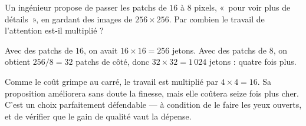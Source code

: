 \begin{exercice}
Un ingénieur propose de passer les patchs de $16$ à $8$ pixels, «~pour voir
plus de détails~», en gardant des images de $256 \times 256$. Par combien le
travail de l'attention est-il multiplié ?
\end{exercice}

\begin{solution}
Avec des patchs de $16$, on avait $16 \times 16 = 256$ jetons. Avec des
patchs de $8$, on obtient $256/8 = 32$ patchs de côté, donc
$32 \times 32 = 1\,024$ jetons : quatre fois plus.

Comme le coût grimpe au carré, le travail est multiplié par
$4 \times 4 = 16$. Sa proposition améliorera sans doute la finesse, mais elle
coûtera seize fois plus cher. C'est un choix parfaitement défendable — à
condition de le faire les yeux ouverts, et de vérifier que le gain de qualité
vaut la dépense.
\end{solution}
